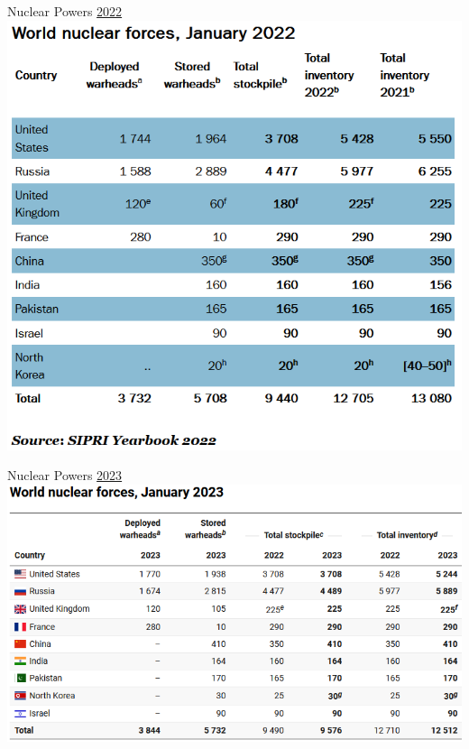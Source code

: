 \documentclass[handout]{beamer}
\begin{document}
\begin{frame}{\LARGE Nuclear Powers \href{https://www.sipri.org/media/press-release/2022/global-nuclear-arsenals-are-expected-grow-states-continue-modernize-new-sipri-yearbook-out-now}{2022}}
	\centering
	\includegraphics[width=\textwidth,height=0.9\textheight,keepaspectratio]{SIPRI2022nuclear.png}
\end{frame}

\begin{frame}{\LARGE Nuclear Powers \href{https://www.sipri.org/media/press-release/2023/states-invest-nuclear-arsenals-geopolitical-relations-deteriorate-new-sipri-yearbook-out-now}{2023}}
	\centering
	\includegraphics[width=\textwidth,height=0.9\textheight,keepaspectratio]{SIPRI2023nuclear.png}
\end{frame}
\end{document}
